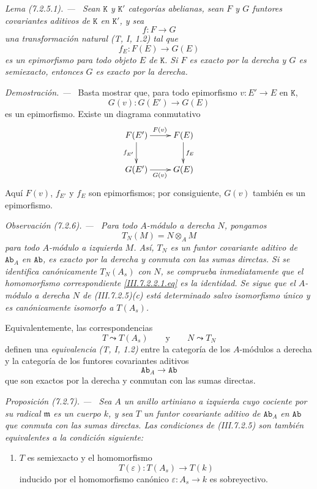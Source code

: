\documentclass[10pt,oneside]{book}
\newcommand{\cat}[1]{\mathtt{#1}}
\newcommand{\sref}[2][]{\textup{(#2)}}
\newenvironment{proposition}[1][]{\par\medskip\noindent\itshape Proposición (#1). ---\ }{\par}
\newenvironment{lemma}[1][]{\par\medskip\noindent\itshape Lema (#1). ---\ }{\par}
\newenvironment{remark}[1][]{\par\medskip\noindent\itshape Observación (#1). ---\ }{\par}
\newenvironment{proof}{\par\medskip\noindent\textit{Demostración. ---\ }}{\par}
\begin{document}
\begin{lemma}[7.2.5.1]
\label{III.7.2.5.1}
Sean $\cat K$ y $\cat K'$ categorías abelianas, sean $F$ y $G$
funtores covariantes aditivos de $\cat K$ en $\cat K'$, y sea
\[
  f:F\longrightarrow G
\]
una transformación natural \emph{(T, I, 1.2)} tal que
\[
  f_E:F(E)\longrightarrow G(E)
\]
es un epimorfismo para todo objeto $E$ de $\cat K$. Si $F$ es
exacto por la derecha y $G$ es semiexacto, entonces $G$ es exacto
por la derecha.
\end{lemma}

\begin{proof}
Basta mostrar que, para todo epimorfismo $v:E'\to E$ en $\cat K$,
\[
  G(v):G(E')\longrightarrow G(E)
\]
es un epimorfismo. Existe un diagrama conmutativo
\[
\xymatrix{
  F(E')\ar[r]^{F(v)}\ar[d]_{f_{E'}}
  & F(E)\ar[d]^{f_E}
  \\
  G(E')\ar[r]_{G(v)}
  & G(E)
}
\]
Aquí $F(v)$, $f_{E'}$ y $f_E$ son epimorfismos; por consiguiente,
$G(v)$ también es un epimorfismo.
\end{proof}

\begin{remark}[7.2.6]
\label{III.7.2.6}
Para todo $A$-módulo a derecha $N$, pongamos
\[
  T_N(M)=N\otimes_A M
\]
para todo $A$-módulo a izquierda $M$. Así, $T_N$ es un funtor
covariante aditivo de $\cat{Ab}_A$ en $\cat{Ab}$, es exacto por
la derecha y conmuta con las sumas directas. Si se identifica
canónicamente $T_N(A_s)$ con $N$, se comprueba inmediatamente que
el homomorfismo correspondiente \eqref{III.7.2.2.1.eq} es la
identidad. Se sigue que el $A$-módulo a derecha $N$ de
\sref{III.7.2.5}(c) está determinado salvo isomorfismo único y es
canónicamente isomorfo a $T(A_s)$.

Equivalentemente, las correspondencias
\[
  T\leadsto T(A_s)
  \qquad\text{y}\qquad
  N\leadsto T_N
\]
definen una \emph{equivalencia} \emph{(T, I, 1.2)} entre la categoría de
los $A$-módulos a derecha y la categoría de los funtores
covariantes aditivos
\[
  \cat{Ab}_A\longrightarrow\cat{Ab}
\]
que son exactos por la derecha y conmutan con las sumas directas.
\end{remark}

\begin{proposition}[7.2.7]
\label{III.7.2.7}
Sea $A$ un anillo artiniano a izquierda cuyo cociente por su
radical $\mathfrak m$ es un cuerpo $k$, y sea $T$ un funtor
covariante aditivo de $\cat{Ab}_A$ en $\cat{Ab}$ que conmuta con
las sumas directas. Las condiciones de \sref{III.7.2.5} son
también equivalentes a la condición siguiente:
\begin{enumerate}
  \item[(d)] $T$ es semiexacto y el homomorfismo
    \[
      T(\varepsilon):T(A_s)\longrightarrow T(k)
    \]
    inducido por el homomorfismo canónico
    $\varepsilon:A_s\to k$ es sobreyectivo.
\end{enumerate}
\end{proposition}
\end{document}
